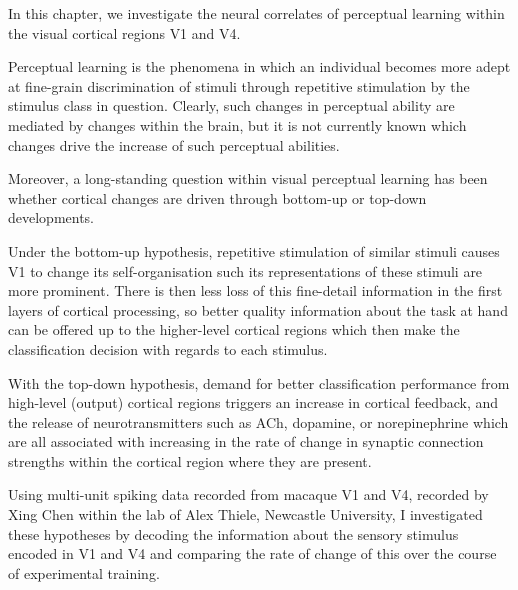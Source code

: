 In this chapter, we investigate the neural correlates of perceptual learning within the visual cortical regions \ac{V1} and \ac{V4}.

Perceptual learning is the phenomena in which an individual becomes more adept at fine-grain discrimination of stimuli through repetitive stimulation by the stimulus class in question.
Clearly, such changes in perceptual ability are mediated by changes within the brain, but it is not currently known which changes drive the increase of such perceptual abilities.

Moreover, a long-standing question within visual perceptual learning has been whether cortical changes are driven through bottom-up or top-down developments.

Under the bottom-up hypothesis, repetitive stimulation of similar stimuli causes \ac{V1} to change its self-organisation such its representations of these stimuli are more prominent.
There is then less loss of this fine-detail information in the first layers of cortical processing, so better quality information about the task at hand can be offered up to the higher-level cortical regions which then make the classification decision with regards to each stimulus.

With the top-down hypothesis, demand for better classification performance from high-level (output) cortical regions triggers an increase in cortical feedback, and the release of neurotransmitters such as \ac{ACh}, dopamine, or norepinephrine which are all associated with increasing in the rate of change in synaptic connection strengths within the cortical region where they are present.

Using multi-unit spiking data recorded from macaque \ac{V1} and \ac{V4}, recorded by Xing Chen within the lab of Alex Thiele, Newcastle University, I investigated these hypotheses by decoding the information about the sensory stimulus encoded in \ac{V1} and \ac{V4} and comparing the rate of change of this over the course of experimental training.
